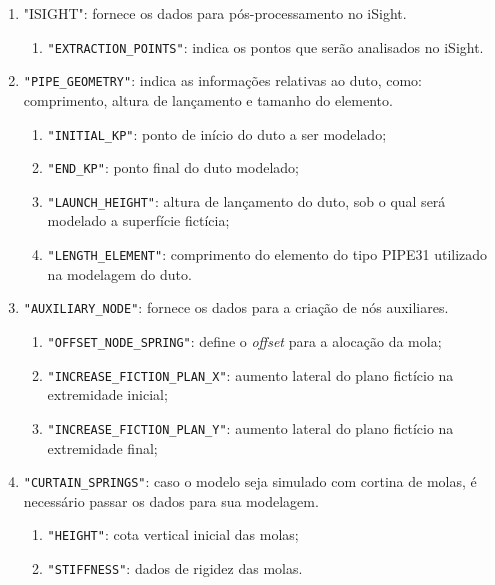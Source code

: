 \begin{enumerate}
    \item "ISIGHT": fornece os dados para pós-processamento no iSight.
        \begin{enumerate}
            \item \texttt{"EXTRACTION\_POINTS"}: indica os pontos que serão analisados no iSight.
        \end{enumerate}
    \item \texttt{"PIPE\_GEOMETRY"}: indica as informações relativas ao duto, como: comprimento, altura de lançamento e tamanho do elemento.
    \begin{enumerate}
        \item \texttt{"INITIAL\_KP"}: ponto de início do duto a ser modelado;
        \item \texttt{"END\_KP"}: ponto final do duto modelado;
        \item \texttt{"LAUNCH\_HEIGHT"}: altura de lançamento do duto, sob o qual será modelado a superfície fictícia;
        \item \texttt{"LENGTH\_ELEMENT"}: comprimento do elemento do tipo PIPE31 utilizado na modelagem do duto.
    \end{enumerate}
    \item \texttt{"AUXILIARY\_NODE"}: fornece os dados para a criação de nós auxiliares.
    \begin{enumerate}
        \item \texttt{"OFFSET\_NODE\_SPRING"}: define o \textit{offset} para a alocação da mola;
        \item \texttt{"INCREASE\_FICTION\_PLAN\_X"}: aumento lateral do plano fictício na extremidade inicial;
        \item \texttt{"INCREASE\_FICTION\_PLAN\_Y"}: aumento lateral do plano fictício na extremidade final;
    \end{enumerate}
    \item \texttt{"CURTAIN\_SPRINGS"}: caso o modelo seja simulado com cortina de molas, é necessário passar os dados para sua modelagem.
    \begin{enumerate}
        \item \texttt{"HEIGHT"}: cota vertical inicial das molas;
        \item \texttt{"STIFFNESS"}: dados de rigidez das molas.
    \end{enumerate}
\end{enumerate}


